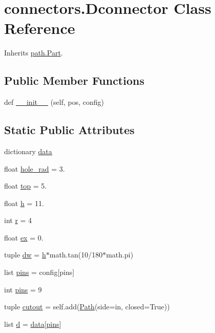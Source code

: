 \hypertarget{classconnectors_1_1_dconnector}{}\section{connectors.\+Dconnector Class Reference}
\label{classconnectors_1_1_dconnector}


Inherits \hyperlink{classpath_1_1_part}{path.\+Part}.

\subsection*{Public Member Functions}
\begin{DoxyCompactItemize}
\item 
def \hyperlink{classconnectors_1_1_dconnector_a7b11131494b9d5035160b4b4fbf7308b}{\+\_\+\+\_\+init\+\_\+\+\_\+} (self, pos, config)
\end{DoxyCompactItemize}
\subsection*{Static Public Attributes}
\begin{DoxyCompactItemize}
\item 
dictionary \hyperlink{classconnectors_1_1_dconnector_a84cb1f3d8a72e078a564368af8639966}{data}
\item 
float \hyperlink{classconnectors_1_1_dconnector_a058868ceb99b52efaf979d67dd401aa7}{hole\+\_\+rad} = 3.
\item 
float \hyperlink{classconnectors_1_1_dconnector_a1de06b15537f4f7a27d89b1110323291}{top} = 5.
\item 
float \hyperlink{classconnectors_1_1_dconnector_a16d2a015c13d9d9213a7dce24d3ca10f}{h} = 11.
\item 
int \hyperlink{classconnectors_1_1_dconnector_ab0330b29404f3255b76a597f8f570c76}{r} = 4
\item 
float \hyperlink{classconnectors_1_1_dconnector_a9b48f02a0e0c0e7e70385d7ed9afe5e2}{ex} = 0.
\item 
tuple \hyperlink{classconnectors_1_1_dconnector_a476e7ddc59901adb338df0ddd6a4331b}{dw} = \hyperlink{classconnectors_1_1_dconnector_a16d2a015c13d9d9213a7dce24d3ca10f}{h}$\ast$math.\+tan(10/180$\ast$math.\+pi)
\item 
list \hyperlink{classconnectors_1_1_dconnector_a8bad4a8b5a4e2ae4b9592e7b3c91bb2f}{pins} = config\mbox{[}\textquotesingle{}pins\textquotesingle{}\mbox{]}
\item 
int \hyperlink{classconnectors_1_1_dconnector_ac9f751fdd098fc9475dba88bbf268f92}{pins} = 9
\item 
tuple \hyperlink{classconnectors_1_1_dconnector_a480d8064d87ece50d384018747befb81}{cutout} = self.\+add(\hyperlink{classpath_1_1_path}{Path}(side=\textquotesingle{}in\textquotesingle{}, closed=True))
\item 
list \hyperlink{classconnectors_1_1_dconnector_af4b9dd5f33e2080e36f536cdad5b5a6c}{d} = \hyperlink{classconnectors_1_1_dconnector_a84cb1f3d8a72e078a564368af8639966}{data}\mbox{[}\hyperlink{classconnectors_1_1_dconnector_a8bad4a8b5a4e2ae4b9592e7b3c91bb2f}{pins}\mbox{]}
\end{DoxyCompactItemize}
